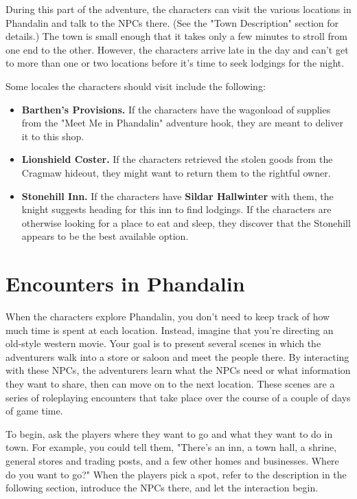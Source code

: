 \documentclass[10pt,a4paper,twoside,bg=print,twocolumn,openany,nodeprecatedcode]{dndbook}
\begin{document}
During this part of the adventure, the characters can visit the various locations in Phandalin and talk to the NPCs there. (See the "Town Description" section for details.) The town is small enough that it takes only a few minutes to stroll from one end to the other. However, the characters arrive late in the day and can't get to more than one or two locations before it's time to seek lodgings for the night.

Some locales the characters should visit include the following:


\begin{itemize}
\item \textbf{Barthen's Provisions.} If the characters have the wagonload of supplies from the "Meet Me in Phandalin" adventure hook, they are meant to deliver it to this shop.
\item \textbf{Lionshield Coster.} If the characters retrieved the stolen goods from the Cragmaw hideout, they might want to return them to the rightful owner.
\item \textbf{Stonehill Inn.} If the characters have \textbf{Sildar Hallwinter} with them, the knight suggests heading for this inn to find lodgings. If the characters are otherwise looking for a place to eat and sleep, they discover that the Stonehill appears to be the best available option.
\end{itemize}

\section{Encounters in Phandalin}
When the characters explore Phandalin, you don't need to keep track of how much time is spent at each location. Instead, imagine that you're directing an old-style western movie. Your goal is to present several scenes in which the adventurers walk into a store or saloon and meet the people there. By interacting with these NPCs, the adventurers learn what the NPCs need or what information they want to share, then can move on to the next location. These scenes are a series of roleplaying encounters that take place over the course of a couple of days of game time.

To begin, ask the players where they want to go and what they want to do in town. For example, you could tell them, "There's an inn, a town hall, a shrine, general stores and trading posts, and a few other homes and businesses. Where do you want to go?" When the players pick a spot, refer to the description in the following section, introduce the NPCs there, and let the interaction begin.
\end{document}
